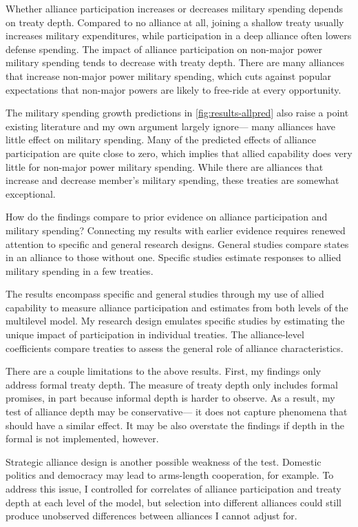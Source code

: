\documentclass[12pt]{article}
\begin{document}
Whether alliance participation increases or decreases military spending depends on treaty depth. 
Compared to no alliance at all, joining a shallow treaty usually increases military expenditures, while participation in a deep alliance often lowers defense spending. 
The impact of alliance participation on non-major power military spending tends to decrease with treaty depth.
There are many alliances that increase non-major power military spending, which cuts against popular expectations that non-major powers are likely to free-ride at every opportunity. 


The military spending growth predictions in \autoref{fig:results-allpred} also raise a point existing literature and my own argument largely ignore--- many alliances have little effect on military spending. 
Many of the predicted effects of alliance participation are quite close to zero, which implies that allied capability does very little for non-major power military spending. 
While there are alliances that increase and decrease member's military spending, these treaties are somewhat exceptional. 


How do the findings compare to prior evidence on alliance participation and military spending? 
Connecting my results with earlier evidence requires renewed attention to specific and general research designs. 
General studies compare states in an alliance to those without one. 
Specific studies estimate responses to allied military spending in a few treaties. 


The results encompass specific and general studies through my use of allied capability to measure alliance participation and estimates from both levels of the multilevel model. 
My research design emulates specific studies by estimating the unique impact of participation in individual treaties. 
The alliance-level coefficients compare treaties to assess the general role of alliance characteristics.  


There are a couple limitations to the above results. 
First, my findings only address formal treaty depth. 
The measure of treaty depth only includes formal promises, in part because informal depth is harder to observe. 
As a result, my test of alliance depth may be conservative--- it does not capture phenomena that should have a similar effect. 
It may be also overstate the findings if depth in the formal is not implemented, however. 


Strategic alliance design is another possible weakness of the test. 
Domestic politics \citep{Davis2004} and democracy \citep{Chibaetal2015} may lead to arms-length cooperation, for example.   
To address this issue, I controlled for correlates of alliance participation and treaty depth at each level of the model, but selection into different alliances could still produce unobserved differences between alliances I cannot adjust for. 
\end{document}
